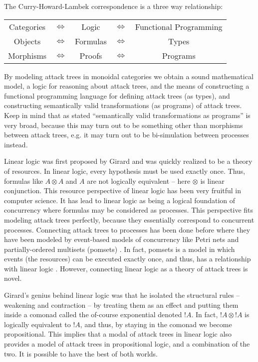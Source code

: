\documentclass{llncs}
\begin{document}
The Curry-Howard-Lambek correspondence is a three way relationship:
\begin{center}
  \setlength{\tabcolsep}{7pt}
  \begin{tabular}{ccccc}
    Categories & $\iff$ & Logic    & $\iff$   & Functional Programming\\
    Objects    & $\iff$ & Formulas & $\iff$   & Types    \\
    Morphisms  & $\iff$ & Proofs   & $\iff$   & Programs 
  \end{tabular}
\end{center}
By modeling attack trees in monoidal categories we obtain a sound
mathematical model, a logic for reasoning about attack trees, and the
means of constructing a functional programming language for defining
attack trees (as types), and constructing semantically valid
transformations (as programs) of attack trees.  Keep in mind that as
stated ``semantically valid transformations as programs'' is very
broad, because this may turn out to be something other than morphisms
between attack trees, e.g. it may turn out to be bi-simulation between
processes instead.

Linear logic was first proposed by Girard \cite{Girard:1987} and was
quickly realized to be a theory of resources.  In linear logic, every
hypothesis must be used exactly once.  Thus, formulas like $A \otimes
A$ and $A$ are not logically equivalent -- here $\otimes$ is linear
conjunction.  This resource perspective of linear logic has been very
fruitful in computer science.  It has lead to linear logic as being a
logical foundation of concurrency where formulas may be considered as
processes.  This perspective fits modeling attack trees perfectly,
because they essentially correspond to concurrent processes.
Connecting attack trees to processes has been done before where they
have been modeled by event-based models of concurrency like Petri nets
and partially-ordered multisets (pomsets)
\cite{Jhawar:2015,Mauw:2006}.  In fact, pomsets is a model in which
events (the resources) can be executed exactly once, and thus, has a
relationship with linear logic \cite{Retore:1997}.  However,
connecting linear logic as a theory of attack trees is novel.

Girard's genius behind linear logic was that he isolated the
structural rules -- weakening and contraction -- by treating them as
an effect and putting them inside a comonad called the of-course
exponential denoted $!A$.  In fact, $!A \otimes !A$ is logically
equivalent to $!A$, and thus, by staying in the comonad we become
propositional.  This implies that a modal of attack trees in linear
logic also provides a model of attack trees in propositional logic,
and a combination of the two.  It is possible to have the best of both
worlds.
\end{document}
